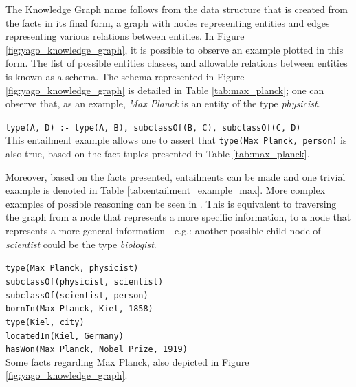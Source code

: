 \documentclass[11pt,a4paper,openright]{memoir}
\begin{document}
The Knowledge Graph name follows from the data structure that is created from the facts in its final form, a graph with nodes representing entities and edges representing various relations between entities. In Figure \ref{fig:yago_knowledge_graph}, it is possible to observe an example plotted in this form. The list of possible entities classes, and allowable relations between entities is known as a schema. The schema represented in Figure \ref{fig:yago_knowledge_graph} is detailed in Table \ref{tab:max_planck}; one can observe that, as an example, \emph{Max Planck} is an entity of the type \emph{physicist}.

\begin{table}[!htbp]
  \centering
  \RaggedRight
    \texttt{type(A, D) :- type(A, B), subclassOf(B, C), subclassOf(C, D)} \\
  \caption[An example of entailment.]{This entailment example allows one to assert that \texttt{type(Max Planck, person)} is also true, based on the fact tuples presented in Table \ref{tab:max_planck}.}
  \label{tab:entailment_example_max}
\end{table}

Moreover, based on the facts presented, entailments can be made and one trivial example is denoted in Table \ref{tab:entailment_example_max}. More complex examples of possible reasoning can be seen in \cite{Surdeanu:2011:CIE:2021153.2021155}. This is equivalent to traversing the graph from a node that represents a more specific information, to a node that represents a more general information - e.g.: another possible child node of \emph{scientist} could be the type \emph{biologist}.

\begin{table}[!htbp]
  \centering
  \RaggedRight
    \texttt{type(Max Planck, physicist)} \\
    \texttt{subclassOf(physicist, scientist)} \\
    \texttt{subclassOf(scientist, person)} \\
    \texttt{bornIn(Max Planck, Kiel, 1858)} \\
    \texttt{type(Kiel, city)} \\
    \texttt{locatedIn(Kiel, Germany)} \\
    \texttt{hasWon(Max Planck, Nobel Prize, 1919)} \\
  \caption[Some facts regarding Max Planck.]{Some facts regarding Max Planck, also depicted in Figure \ref{fig:yago_knowledge_graph}.}
  \label{tab:max_planck}
\end{table}
\end{document}
